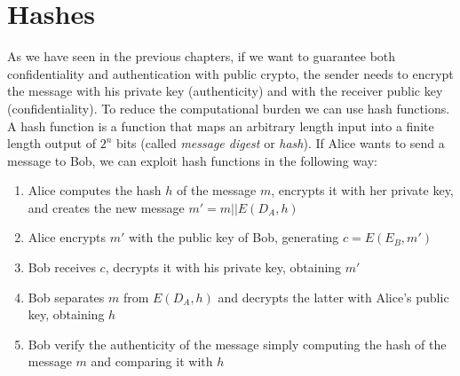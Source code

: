 \section{Hashes}
As we have seen in the previous chapters, if we want to guarantee both confidentiality and authentication with public crypto, the sender needs to encrypt the message with his private key (authenticity) and with the receiver public key (confidentiality). To reduce the computational burden we can use hash functions.\\
A hash function is a function that maps an arbitrary length input into a finite length output of $2^n$ bits (called \textit{message digest} or \textit{hash}).
If Alice wants to send a message to Bob, we can exploit hash functions in the following way:
\begin{figure}
\vspace{50pt}
\end{figure}
\begin{enumerate}
    \item Alice computes the hash $h$ of the message $m$, encrypts it with her private key, and creates the new message $m'=m||E(D_A,h)$
    \item Alice encrypts $m'$ with the public key of Bob, generating $c=E(E_B,m')$
    \item Bob receives $c$, decrypts it with his private key, obtaining $m'$
    \item Bob separates $m$ from $E(D_A,h)$ and decrypts the latter with Alice's public key, obtaining $h$
    \item Bob verify the authenticity of the message simply computing the hash of the message $m$ and comparing it with $h$
\end{enumerate}

